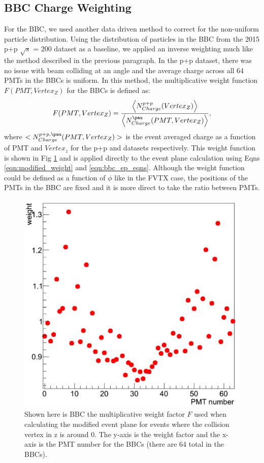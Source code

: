 \subsection{BBC Charge Weighting}
\label{sec:bbc_charge_weight}
For the BBC, we used another data driven method to correct for the non-uniform particle distribution. Using the distribution of particles in the BBC from the 2015 p+p $\sqrt{s}$ = 200 dataset as a baseline, we applied an inverse weighting much like the method described in the previous paragraph. In the p+p dataset, there was no issue with beam colliding at an angle and the average charge across all 64 PMTs in the BBCs is uniform. In this method, the multiplicative weight function $F(PMT,Vertex_Z)$ for the BBCs is defined as:
\begin{equation}
F(PMT,Vertex_Z) = \frac{\left<N^{p+p}_{Charge}(Vertex_Z)\right>}{\left<N^{\pau}_{Charge}(PMT,Vertex_Z)\right>},
\end{equation}
where $<N^{p+p,\pau}_{Charge}(PMT,Vertex_Z)>$ is the event averaged charge as a function of PMT and $Vertex_z$ for the p+p and \pau datasets respectively. 
This weight function is shown in Fig \ref{fig:bbc_weight_function} and is applied directly to the event plane calculation using Eqns \ref{eqn:modified_weight} and \ref{eqn:bbc_ep_eqns}. 
Although the weight function could be defined as a function of $\phi$ like in the FVTX case, the positions of the PMTs in the BBC are fixed and it is more direct to take the ratio between PMTs.

\begin{figure}[h!]
\begin{center}
\includegraphics[width=0.5\linewidth]{figs/pmt_ratio_weight.png}
\caption{Shown here is BBC the multiplicative weight factor $F$ used when calculating the modified event plane for events where the collision vertex in z is around 0. The y-axis is the weight factor and the x-axis is the PMT number for the BBCs (there are 64 total in the BBCs). }
\label{fig:bbc_weight_function}
\end{center}
\end{figure}


